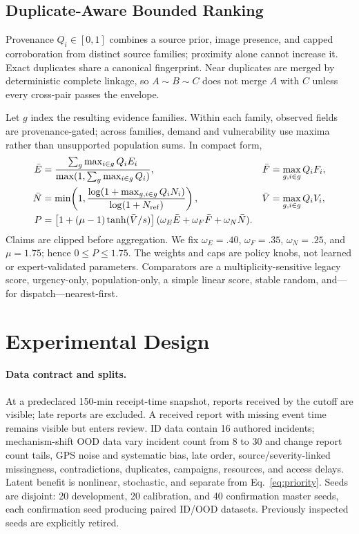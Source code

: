 \documentclass[runningheads]{llncs}
\begin{document}
\subsection{Duplicate-Aware Bounded Ranking}

Provenance $Q_i\in[0,1]$ combines a source prior, image presence, and capped
corroboration from distinct source families; proximity alone cannot increase
it. Exact duplicates share a canonical fingerprint. Near duplicates are
merged by deterministic complete linkage, so $A\sim B\sim C$ does not merge
$A$ with $C$ unless every cross-pair passes the envelope.

Let $g$ index the resulting evidence families. Within each family, observed
fields are provenance-gated; across families, demand and vulnerability use
maxima rather than unsupported population sums. In compact form,
\begin{align}
\bar E&=\frac{\sum_g\max_{i\in g}Q_iE_i}
 {\max(1,\sum_g\max_{i\in g}Q_i)},&
\bar F&=\max_{g,i\in g}Q_iF_i,\nonumber\\
\bar N&=\min\!\left(1,\frac{\log(1+\max_{g,i\in g}Q_iN_i)}
 {\log(1+N_{\rm ref})}\right),&
\bar V&=\max_{g,i\in g}Q_iV_i,\nonumber\\
P&=\left[1+(\mu-1)\tanh(\bar V/s)\right]
 (\omega_E\bar E+\omega_F\bar F+\omega_N\bar N).
\label{eq:priority}
\end{align}
Claims are clipped before aggregation. We fix $\omega_E=.40$,
$\omega_F=.35$, $\omega_N=.25$, and $\mu=1.75$; hence
$0\le P\le1.75$. The weights and caps are policy knobs, not learned or
expert-validated parameters. Comparators are a multiplicity-sensitive legacy
score, urgency-only, population-only, a simple linear score, stable random,
and---for dispatch---nearest-first.

\section{Experimental Design}

\paragraph{Data contract and splits.}
At a predeclared 150-min receipt-time snapshot, reports received by the cutoff
are visible; late reports are excluded. A received report with missing event
time remains visible but enters review. ID data contain 16 authored incidents;
mechanism-shift OOD data vary incident count from 8 to 30 and change report
count tails, GPS noise and systematic bias, late order, source/severity-linked
missingness, contradictions, duplicates, campaigns, resources, and access
delays. Latent benefit is nonlinear, stochastic, and separate from
Eq.~\ref{eq:priority}. Seeds are disjoint: 20 development, 20 calibration, and
40 confirmation master seeds, each confirmation seed producing paired ID/OOD
datasets. Previously inspected seeds are explicitly retired.
\end{document}
